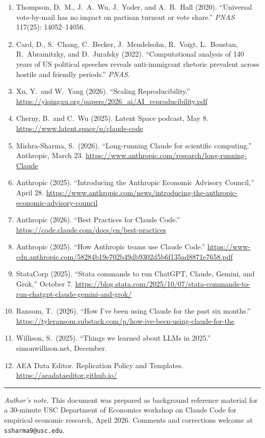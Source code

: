 \documentclass[11pt]{article}
\begin{document}
\begin{enumerate}[leftmargin=*,nosep]
    \item Thompson, D.\ M., J.\ A.\ Wu, J.\ Yoder, and A.\ B.\ Hall (2020). ``Universal vote-by-mail has no impact on partisan turnout or vote share.'' \emph{PNAS} 117(25): 14052--14056.
    \item Card, D., S.\ Chang, C.\ Becker, J.\ Mendelsohn, R.\ Voigt, L.\ Boustan, R.\ Abramitzky, and D.\ Jurafsky (2022). ``Computational analysis of 140 years of US political speeches reveals anti-immigrant rhetoric prevalent across hostile and friendly periods.'' \emph{PNAS}.
    \item Xu, Y.\ and W.\ Yang (2026). ``Scaling Reproducibility.'' \url{https://yiqingxu.org/papers/2026_ai/AI_reproducibility.pdf}
    \item Cherny, B.\ and C.\ Wu (2025). Latent Space podcast, May 8. \url{https://www.latent.space/p/claude-code}
    \item Mishra-Sharma, S.\ (2026). ``Long-running Claude for scientific computing.'' Anthropic, March 23. \url{https://www.anthropic.com/research/long-running-Claude}
    \item Anthropic (2025). ``Introducing the Anthropic Economic Advisory Council,'' April 28. \url{https://www.anthropic.com/news/introducing-the-anthropic-economic-advisory-council}
    \item Anthropic (2026). ``Best Practices for Claude Code.'' \url{https://code.claude.com/docs/en/best-practices}
    \item Anthropic (2025). ``How Anthropic teams use Claude Code.'' \url{https://www-cdn.anthropic.com/58284b19e702b49db9302d5b6f135ad8871e7658.pdf}
    \item StataCorp (2025). ``Stata commands to run ChatGPT, Claude, Gemini, and Grok,'' October 7. \url{https://blog.stata.com/2025/10/07/stata-commands-to-run-chatgpt-claude-gemini-and-grok/}
    \item Ransom, T.\ (2026). ``How I've been using Claude for the past six months.'' \url{https://tyleransom.substack.com/p/how-ive-been-using-claude-for-the}
    \item Willison, S.\ (2025). ``Things we learned about LLMs in 2025.'' simonwillison.net, December.
    \item AEA Data Editor. Replication Policy and Templates. \url{https://aeadataeditor.github.io/}
\end{enumerate}

\vspace{1em}
\noindent\rule{\linewidth}{0.4pt}
\small\textit{Author's note.} This document was prepared as background reference material for a 30-minute USC Department of Economics workshop on Claude Code for empirical economic research, April 2026. Comments and corrections welcome at \texttt{ssharma9@usc.edu}.
\end{document}
